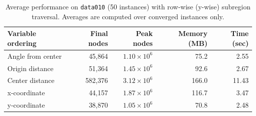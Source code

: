 \begin{table}[t]
\centering
\caption{Average performance on \texttt{data010} (50 instances) with row-wise (y-wise) subregion traversal. Averages are computed over converged instances only.}
\label{tab:ordering_ywise}
\begin{tabular}{lrrrr}
\toprule
Variable ordering & Final nodes & Peak nodes & Memory (MB) & Time (sec) \\
\midrule
Angle from center & 45,864 & $1.10\times 10^{6}$ & 75.2 & 2.55 \\
Origin distance & 51,364 & $1.45\times 10^{6}$ & 92.6 & 2.67 \\
Center distance & 582,376 & $3.12\times 10^{6}$ & 166.0 & 11.43 \\
x-coordinate & 44,157 & $1.87\times 10^{6}$ & 116.7 & 3.47 \\
y-coordinate & 38,870 & $1.05\times 10^{6}$ & 70.8 & 2.48 \\
\bottomrule
\end{tabular}
\end{table}
